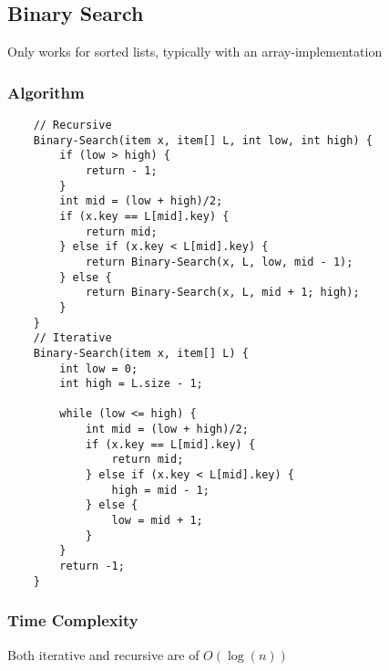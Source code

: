 \documentclass[10pt, 
a4paper, 
oneside, 
headinclude, footinclude, 
BCOR5mm]
{scrartcl}
\begin{document}
\subsection{Binary Search}
Only works for sorted lists, typically with an array-implementation
\subsubsection{Algorithm}
\begin{lstlisting}
    // Recursive
    Binary-Search(item x, item[] L, int low, int high) {
        if (low > high) {
            return - 1;
        }
        int mid = (low + high)/2;
        if (x.key == L[mid].key) {
            return mid;
        } else if (x.key < L[mid].key) {
            return Binary-Search(x, L, low, mid - 1);
        } else {
            return Binary-Search(x, L, mid + 1; high);
        }
    }
    // Iterative
    Binary-Search(item x, item[] L) {
        int low = 0;
        int high = L.size - 1;
        
        while (low <= high) {
            int mid = (low + high)/2;
            if (x.key == L[mid].key) {
                return mid;
            } else if (x.key < L[mid].key) {
                high = mid - 1;
            } else {
                low = mid + 1;
            }
        }
        return -1;
    }
\end{lstlisting}
\subsubsection{Time Complexity}
Both iterative and recursive are of $O(\log(n))$
\end{document}
